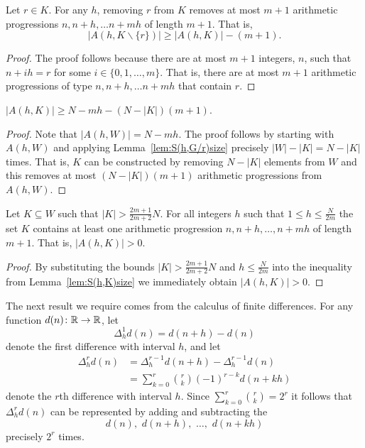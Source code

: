 \documentclass[journal]{IEEEtran}
\begin{document}
\begin{lemma} \label{lem:S(h,G/r)size}
Let $r \in K$.  For any $h$, removing $r$ from $K$ removes at most $m+1$ arithmetic progressions $n, n+h, \dots n+mh$ of length $m+1$.  That is,
\[
|A(h,K \backslash \{r\})| \geq |A(h,K)| - (m+1).
\]
\end{lemma}
\begin{proof}
The proof follows because there are at most $m+1$ integers, $n$, such that $n+ih = r$ for some $i \in \{0,1,\dots,m\}$.  That is, there are at most $m+1$ arithmetic progressions of type $n, n+h, \dots n+mh$ that contain $r$.
\end{proof}

 \begin{lemma} \label{lem:S(h,K)size}
 $|A(h,K)| \geq N - mh - (N - |K|)(m+1)$.
 \end{lemma}
 \begin{proof}
 Note that $|A(h,W)| = N - mh$.  The proof follows by starting with $A(h,W)$ and applying Lemma~\ref{lem:S(h,G/r)size} precisely $|W|-|K|=N-|K|$ times. That is, $K$ can be constructed by removing $N - |K|$ elements from $W$ and this removes at most $(N - |K|)(m+1)$ arithmetic progressions from $A(h,W)$.
 \end{proof}
 
 \begin{corollary} \label{cor:S(h,K)>0}
 Let $K \subseteq W$ such that $|K| > \frac{2m+1}{2m+2}N$. For all integers $h$ such that $1\leq h \leq\frac{N}{2m}$ the set $K$ contains at least one arithmetic progression $n, n+h, \dots, n+mh$ of length $m+1$. That is, $|A(h,K)| > 0$.
 \end{corollary}
 \begin{proof}
 By substituting the bounds $|K| > \frac{2m+1}{2m+2}N$ and $h \leq\frac{N}{2m}$ into the inequality from Lemma~\ref{lem:S(h,K)size} we immediately obtain $|A(h,K)| > 0$.
 \end{proof}

The next result we require comes from the calculus of finite differences. For any function $d(n)\colon{\mathbb R}\to{\mathbb R}$, let 
\[
\Delta_h^1 d(n) = d(n+h) - d(n)
\] 
denote the first difference with interval $h$, and let
\begin{equation}\label{eq:mthdiffformula}
\begin{split}
\Delta_h^r d(n) &= \Delta_h^{r-1} d(n+h) - \Delta_h^{r-1} d(n) \\
&= \sum_{k=0}^{r}\binom{r}{k}(-1)^{r-k}d(n+kh)
\end{split}
\end{equation}
denote the $r$th difference with interval $h$. Since $\sum_{k=0}^{r}\binom{r}{k} = 2^r$ it follows that $\Delta_h^r d(n)$ can be represented by adding and subtracting the 
\[
d(n), \,\, d(n+h), \,\, \dots, \,\, d(n+kh)
\] 
precisely $2^r$ times.
\end{document}
